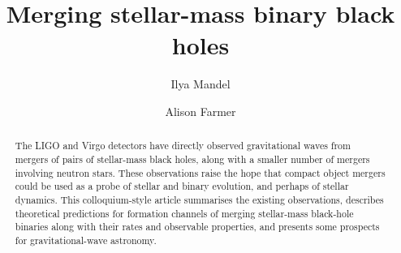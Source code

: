 \documentclass[review]{elsarticle}
\begin{document}

\begin{frontmatter}



\title{Merging stellar-mass binary black holes}


\author[1,2,3]{Ilya Mandel}
{}
\author[4]{Alison Farmer}

\begin{abstract}
The LIGO and Virgo detectors have directly observed gravitational waves from mergers of pairs of stellar-mass black holes, along with a smaller number of mergers involving neutron stars.  These observations raise the hope that compact object mergers could be used as a probe of stellar and binary evolution, and perhaps of stellar dynamics. This colloquium-style article summarises the existing observations, describes theoretical predictions for formation channels of merging stellar-mass black-hole binaries along with their rates and observable properties, and presents some prospects for gravitational-wave astronomy.
\end{abstract}



\end{frontmatter}

\linenumbers
\end{document}
